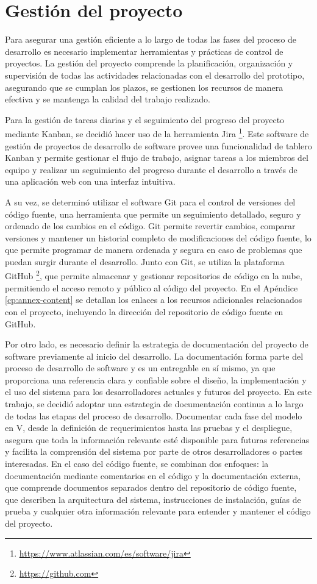 \section{Gestión del proyecto}

Para asegurar una gestión eficiente a lo largo de todas las fases del proceso de desarrollo es necesario implementar herramientas y prácticas de control de proyectos. La gestión del proyecto comprende la planificación, organización y supervisión de todas las actividades relacionadas con el desarrollo del prototipo, asegurando que se cumplan los plazos, se gestionen los recursos de manera efectiva y se mantenga la calidad del trabajo realizado.

Para la gestión de tareas diarias y el seguimiento del progreso del proyecto mediante Kanban, se decidió hacer uso de la herramienta Jira \footnote{\url{https://www.atlassian.com/es/software/jira}}. Este \gls{software} de gestión de proyectos de desarrollo de software provee una funcionalidad de tablero Kanban y permite gestionar el flujo de trabajo, asignar tareas a los miembros del equipo y realizar un seguimiento del progreso durante el desarrollo a través de una aplicación web con una interfaz intuitiva. 

A su vez, se determinó utilizar el software Git para el control de versiones del código fuente, una herramienta que permite un seguimiento detallado, seguro y ordenado de los cambios en el código. Git permite revertir cambios, comparar versiones y mantener un historial completo de modificaciones del código fuente, lo que permite programar de manera ordenada y segura en caso de problemas que puedan surgir durante el desarrollo. Junto con Git, se utiliza la plataforma GitHub \footnote{\url{https://github.com}}, que permite almacenar y gestionar repositorios de código en la nube, permitiendo el acceso remoto y público al código del proyecto. En el Apéndice \ref{cp:annex-content} se detallan los enlaces a los recursos adicionales relacionados con el proyecto, incluyendo la dirección del repositorio de código fuente en GitHub.

Por otro lado, es necesario definir la estrategia de documentación del proyecto de software previamente al inicio del desarrollo. La documentación forma parte del proceso de desarrollo de software y es un entregable en sí mismo, ya que proporciona una referencia clara y confiable sobre el diseño, la implementación y el uso del sistema para los desarrolladores actuales y futuros del proyecto. En este trabajo, se decidió adoptar una estrategia de documentación continua a lo largo de todas las etapas del proceso de desarrollo. Documentar cada fase del modelo en V, desde la definición de requerimientos hasta las pruebas y el despliegue, asegura que toda la información relevante esté disponible para futuras referencias y facilita la comprensión del sistema por parte de otros desarrolladores o partes interesadas. En el caso del código fuente, se combinan dos enfoques: la documentación mediante comentarios en el código y la documentación externa, que comprende documentos separados dentro del repositorio de código fuente, que describen la arquitectura del sistema, instrucciones de instalación, guías de prueba y cualquier otra información relevante para entender y mantener el código del proyecto.

